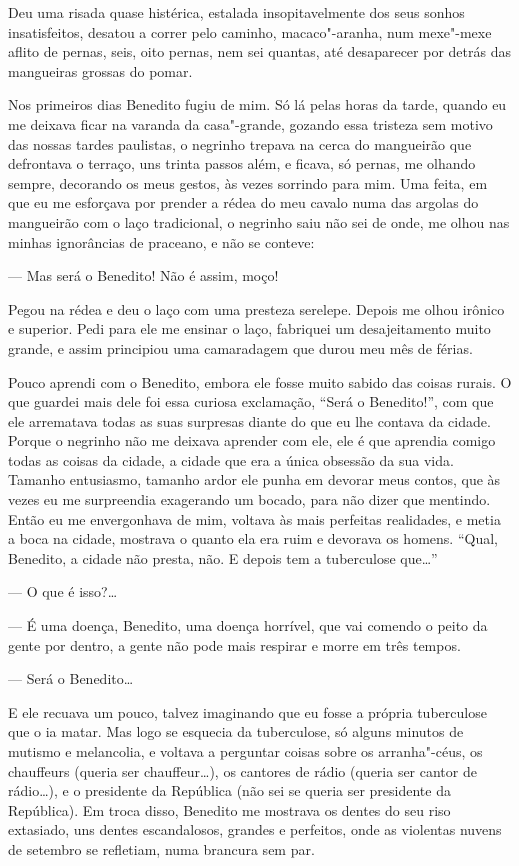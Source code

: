 Deu uma risada quase histérica, estalada insopitavelmente dos seus
sonhos insatisfeitos, desatou a correr pelo caminho, macaco"-aranha, num
mexe"-mexe aflito de pernas, seis, oito pernas, nem sei quantas, até
desaparecer por detrás das mangueiras grossas do pomar.

Nos primeiros dias Benedito fugiu de mim. Só lá pelas horas da tarde,
quando eu me deixava ficar na varanda da casa"-grande, gozando essa
tristeza sem motivo das nossas tardes paulistas, o negrinho trepava na
cerca do mangueirão que defrontava o terraço, uns trinta passos além, e
ficava, só pernas, me olhando sempre, decorando os meus gestos, às vezes
sorrindo para mim. Uma feita, em que eu me esforçava por prender a rédea
do meu cavalo numa das argolas do mangueirão com o laço tradicional, o
negrinho saiu não sei de onde, me olhou nas minhas ignorâncias de
praceano, e não se conteve:

--- Mas será o Benedito! Não é assim, moço!

Pegou na rédea e deu o laço com uma presteza serelepe. Depois me olhou
irônico e superior. Pedi para ele me ensinar o laço, fabriquei um
desajeitamento muito grande, e assim principiou uma camaradagem que
durou meu mês de férias.

Pouco aprendi com o Benedito, embora ele fosse muito sabido das coisas
rurais. O que guardei mais dele foi essa curiosa exclamação, ``Será o
Benedito!'', com que ele arrematava todas as suas surpresas diante do
que eu lhe contava da cidade. Porque o negrinho não me deixava aprender
com ele, ele é que aprendia comigo todas as coisas da cidade, a cidade
que era a única obsessão da sua vida. Tamanho entusiasmo, tamanho ardor
ele punha em devorar meus contos, que às vezes eu me surpreendia
exagerando um bocado, para não dizer que mentindo. Então eu me
envergonhava de mim, voltava às mais perfeitas realidades, e metia a
boca na cidade, mostrava o quanto ela era ruim e devorava os homens.
``Qual, Benedito, a cidade não presta, não. E depois tem a tuberculose
que\ldots{}''

--- O que é isso?\ldots{}

--- É uma doença, Benedito, uma doença horrível, que vai comendo o peito
da gente por dentro, a gente não pode mais respirar e morre em três
tempos.

--- Será o Benedito\ldots{}

E ele recuava um pouco, talvez imaginando que eu fosse a própria
tuberculose que o ia matar. Mas logo se esquecia da tuberculose, só
alguns minutos de mutismo e melancolia, e voltava a perguntar coisas
sobre os arranha"-céus, os chauffeurs (queria ser chauffeur\ldots{}), os
cantores de rádio (queria ser cantor de rádio\ldots{}), e o presidente da
República (não sei se queria ser presidente da República). Em troca
disso, Benedito me mostrava os dentes do seu riso extasiado, uns dentes
escandalosos, grandes e perfeitos, onde as violentas nuvens de setembro
se refletiam, numa brancura sem par.

